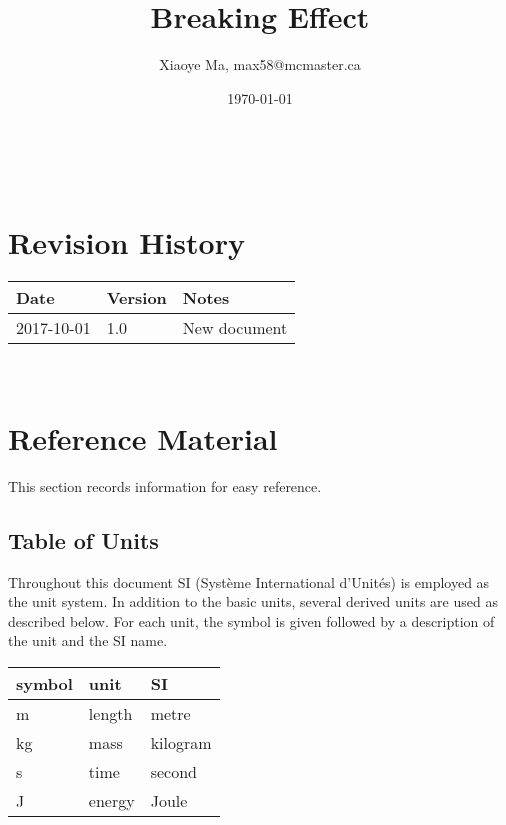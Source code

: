 \documentclass[12pt]{article}
\begin{document}
\title{Breaking Effect} 
\author{Xiaoye Ma, max58@mcmaster.ca}
\date{\today}
	
\maketitle

~\newpage


\section{Revision History}

\begin{tabularx}{\textwidth}{p{3cm}p{2cm}X}
\toprule {\bf Date} & {\bf Version} & {\bf Notes}\\
\midrule
2017-10-01 & 1.0 & New document\\
\bottomrule
\end{tabularx}

~\newpage

\section{Reference Material}

This section records information for easy reference.

\subsection{Table of Units}

Throughout this document SI (Syst\`{e}me International d'Unit\'{e}s) is employed
as the unit system.  In addition to the basic units, several derived units are
used as described below.  For each unit, the symbol is given followed by a
description of the unit and the SI name.
~\newline

\renewcommand{\arraystretch}{1.2}
  \noindent \begin{tabular}{l l l} 
    \toprule		
    \textbf{symbol} & \textbf{unit} & \textbf{SI}\\
    \midrule 
    \si{\metre} & length & metre\\
    \si{\kilogram} & mass	& kilogram\\
    \si{\second} & time & second\\
    \si{\joule} & energy & Joule\\
    \bottomrule
  \end{tabular}
\end{document}
